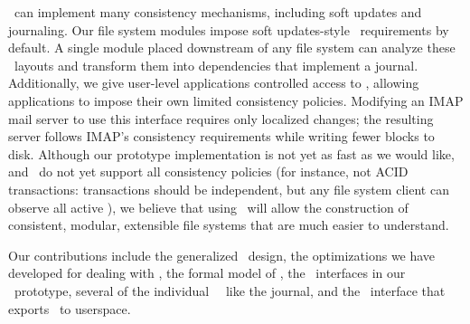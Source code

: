 \Chdescs\ can implement many consistency mechanisms, including
 soft updates and journaling.
%
Our file system modules impose soft updates-style \chdesc\
 requirements by default.
%
A single module placed downstream of any file system can analyze these
 \chdesc\ layouts and transform them into dependencies that
 implement a journal.
%
Additionally, we give user-level applications controlled access to \chdescs,
allowing applications to impose their own limited consistency
 policies.
%
Modifying an IMAP mail server to use this interface requires only localized
 changes; the resulting server follows IMAP's consistency
 requirements while writing fewer blocks to disk.
%
Although our prototype implementation is not yet as fast as we would like,
 and \chdescs\ do not yet support all consistency policies (for instance,
 not ACID transactions: transactions should be independent, but any file
 system client can observe all active \chdescs), we believe that using
 \chdescs\ will allow the construction of consistent, modular, extensible
 file systems that are much easier to understand.


Our contributions include the generalized \chdesc\ design, the
 optimizations we have developed for dealing with \chdescs, the formal
 model of \chdescs, the \module\ interfaces in our \Kudos\ prototype,
 several of the individual \Kudos\ \modules\ like the journal, and the
 \opgroup\ interface that exports \chdescs\ to userspace.


